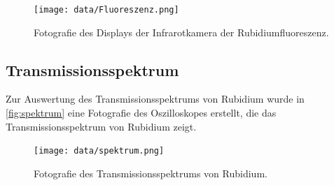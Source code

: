 \begin{figure}[H]
  \centering
  \texttt{[image: data/Fluoreszenz.png]}
  \caption{Fotografie des Displays der Infrarotkamera der Rubidiumfluoreszenz.}
  \label{fig:fluoreszenz}
\end{figure}

\subsection{Transmissionsspektrum}
\label{subsec:Transmissionsspektrum}

Zur Auswertung des Transmissionsspektrums von Rubidium wurde in \autoref{fig:spektrum} eine Fotografie des Oszilloskopes erstellt, die das Transmissionsspektrum von Rubidium zeigt.

\begin{figure}[H]
  \centering
  \texttt{[image: data/spektrum.png]}
  \caption{Fotografie des Transmissionsspektrums von Rubidium.}
  \label{fig:spektrum}
\end{figure}